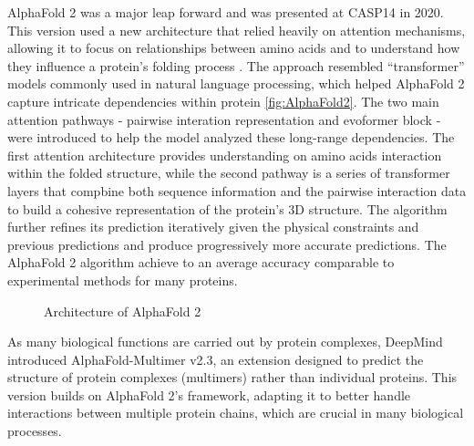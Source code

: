 \documentclass[a4paper]{article}
\begin{document}
AlphaFold 2 was a major leap forward and was presented at CASP14 in 2020. This version used a new architecture that relied heavily on attention mechanisms, allowing it to focus on relationships between amino acids and to understand how they influence a protein’s folding process \cite{jumper_highly_2021}. The approach resembled “transformer” models commonly used in natural language processing, which helped AlphaFold 2 capture intricate dependencies within protein \autoref{fig:AlphaFold2}. The two main attention pathways - pairwise interation representation and evoformer block - were introduced to help the model analyzed these long-range dependencies. The first attention architecture provides understanding on amino acids interaction within the folded structure, while the second pathway is a series of transformer layers that compbine both sequence information and the pairwise interaction data to build a cohesive representation of the protein's 3D structure. The algorithm further refines its prediction iteratively given the physical constraints and previous predictions and produce progressively more accurate predictions. The AlphaFold 2 algorithm achieve to an average accuracy comparable to experimental methods for many proteins.

\begin{figure}[h]
    \caption{Architecture of AlphaFold 2} 
    \label{fig:AlphaFold2}
\end{figure}


As many biological functions are carried out by protein complexes, DeepMind introduced AlphaFold-Multimer v2.3, an extension designed to predict the structure of protein complexes (multimers) rather than individual proteins. This version builds on AlphaFold 2’s framework, adapting it to better handle interactions between multiple protein chains, which are crucial in many biological processes.
\end{document}
